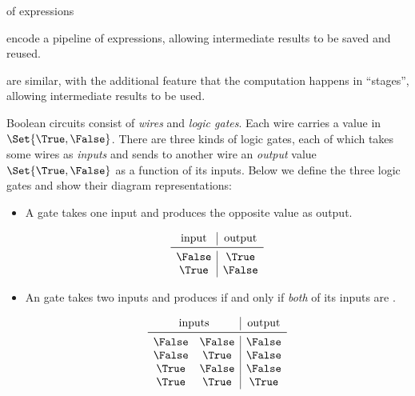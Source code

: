 of
expressions

encode a pipeline of expressions, allowing intermediate results to be saved and
reused.

are similar, with the additional
feature that the computation happens in ``stages'', allowing intermediate
results to be used.

Boolean circuits consist of \emph{wires} and \emph{logic gates}.  Each
wire carries a value in \(\Set{\True,\False}\).  There are three kinds of logic
gates, each of which takes some wires as \emph{inputs} and sends to another
wire an \emph{output} value \(\Set{\True,\False}\) as a function of its inputs.
Below we define the three logic gates and show their diagram representations:
\begin{itemize}

  \item A \NOT{} gate takes one input and produces the opposite value as
    output.

    \begin{center}
    \end{center}
    \[
      \begin{array}{c|c}
        \text{input} & \text{output} \\ \midrule
        \False & \True \\
        \True & \False
      \end{array}
    \]

  \item An \AND{} gate takes two inputs and produces \True{} if and only if
    \emph{both} of its inputs are \True.

    \begin{center}
    \end{center}
    \[
      \begin{array}{cc|c}
        \multicolumn{2}{c|}{\text{inputs}} & \text{output} \\ \midrule
        \False & \False & \False \\
        \False & \True & \False \\
        \True & \False & \False \\
        \True & \True & \True
      \end{array}
    \]


\end{itemize}
